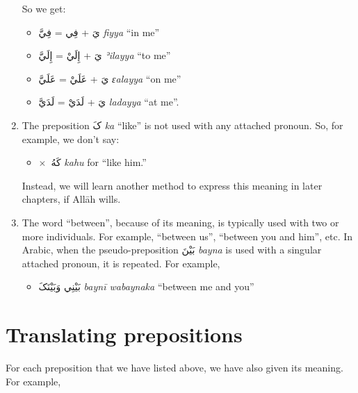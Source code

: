 \documentclass[
  10pt,
]{book}
\providecommand{\tightlist}{%
  \setlength{\itemsep}{0pt}\setlength{\parskip}{0pt}}
\begin{document}
\begin{enumerate}
  So we get:

  \begin{itemize}
  \tightlist
  \item
    \foreignlanguage{arabic}{يَ} + \foreignlanguage{arabic}{فِي} = \foreignlanguage{arabic}{فِيَّ} \emph{fiyya} \enquote{in me}
  \item
    \foreignlanguage{arabic}{يَ} + \foreignlanguage{arabic}{إِلَيْ} = \foreignlanguage{arabic}{إِلَيَّ} \emph{ʾilayya} \enquote{to me}
  \item
    \foreignlanguage{arabic}{يَ} + \foreignlanguage{arabic}{عَلَيْ} = \foreignlanguage{arabic}{عَلَيَّ} \emph{ɛalayya} \enquote{on me}
  \item
    \foreignlanguage{arabic}{يَ} + \foreignlanguage{arabic}{لَدَيْ} = \foreignlanguage{arabic}{لَدَيَّ} \emph{ladayya} \enquote{at me}.
  \end{itemize}
\item
  The preposition \foreignlanguage{arabic}{کَ} \emph{ka} \enquote{like} is not used with any attached pronoun. So, for example, we don't say:

  \begin{itemize}
  \tightlist
  \item
    \(\times\)~\foreignlanguage{arabic}{کَهُ} \emph{kahu} for \enquote{like him.}
  \end{itemize}

  Instead, we will learn another method to express this meaning in later chapters, if Allāh wills.
\item
  The word \enquote{between}, because of its meaning, is typically used with two or more individuals. For example, \enquote{between us}, \enquote{between you and him}, etc. In Arabic, when the pseudo-preposition \foreignlanguage{arabic}{بَيْنَ} \emph{bayna} is used with a singular attached pronoun, it is repeated. For example,

  \begin{itemize}
  \tightlist
  \item
    \foreignlanguage{arabic}{بَيْنِي وَبَيْنَکَ} \emph{baynī wabaynaka} \enquote{between me and you}
  \end{itemize}
\end{enumerate}

\section{Translating prepositions}\label{translating-prepositions}

For each preposition that we have listed above, we have also given its meaning. For example,
\end{document}
